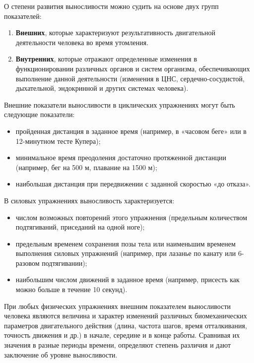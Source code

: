 О степени развития выносливости можно судить на основе двух групп показателей:
\begin{enumerate}
    \item \textbf{Внешних}, которые характеризуют результативность двигательной деятельности человека во время утомления.
    \item \textbf{Внутренних}, которые отражают определенные изменения в функционировании различных органов и систем
          организма, обеспечивающих выполнение данной деятельности (изменения в ЦНС, сердечно-сосудистой, дыхательной,
          эндокринной и других системах человека).
\end{enumerate}

Внешние показатели выносливости в циклических упражнениях могут быть следующие показатели:
\begin{itemize}
    \item пройденная дистанция в заданное время (например, в «часовом беге» или в 12-минутном тесте Купера);
    \item минимальное время преодоления достаточно протяженной дистанции (например, бег на 500 м, плавание на 1500 м);
    \item наибольшая дистанция при передвижении с заданной скоростью «до отказа».
\end{itemize}

В силовых упражнениях выносливость характеризуется:
\begin{itemize}
    \item числом возможных повторений этого упражнения (предельным количеством подтягиваний, приседаний на одной ноге);
    \item предельным временем сохранения позы тела или наименьшим временем выполнения силовых упражнений (например,
          при лазанье по канату или 6-разовом подтягивании);
    \item наибольшим числом движений в заданное время (например, присесть как можно больше в течение 10 секунд).
\end{itemize}

При любых физических упражнениях внешним показателем выносливости человека являются величина и характер изменений различных
биомеханических параметров двигательного действия (длина, частота шагов, время отталкивания, точность движения и др.)
в начале, середине и в конце работы. Сравнивая их значения в разные периоды времени, определяют степень различия и дают
заключение об уровне выносливости.
